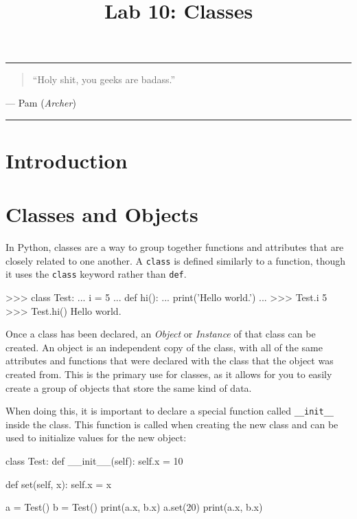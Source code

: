 \documentclass[11pt]{cselabheader}
\title{Lab 10: Classes}
\begin{document}
\maketitle

\hrule
\begin{quotation}
``Holy shit, you geeks are badass.''
\end{quotation}
\begin{flushright}
  --- Pam (\emph{Archer})
\end{flushright}

\hrule

\pagebreak
\section{Introduction}


\pagebreak

\section{Classes and Objects}
\label{sec:classes}
In Python, classes are a way to group together functions and attributes
that are closely related to one another. A \lstinline{class} is defined
similarly to a function, though it uses the \lstinline{class} keyword rather
than \lstinline{def}.

\begin{pyconcode}
>>> class Test:
...     i = 5
...     def hi():
...         print('Hello world.')
... 
>>> Test.i
5
>>> Test.hi()
Hello world.
\end{pyconcode}

Once a class has been declared, an \emph{Object} or
\emph{Instance} of that class can be created. An object is an independent
copy of the class, with all of the same attributes and functions that were
declared with the class that the object was created from. This is the
primary use for classes, as it allows for you to easily create a group of
objects that store the same kind of data.

When doing this, it is important to declare a special function called
\lstinline{__init__} inside the class. This function is called when
creating the new class and can be used to initialize values for the
new object:

\begin{python3code}
class Test:
    def __init__(self):
        self.x = 10

    def set(self, x):
        self.x = x

a = Test()
b = Test()
print(a.x, b.x)
a.set(20)
print(a.x, b.x)
\end{python3code}
\end{document}
